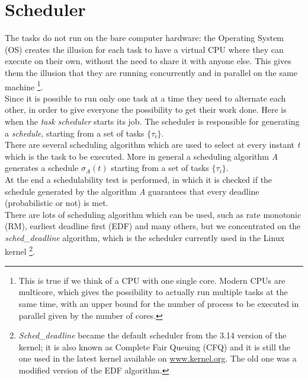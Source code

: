 \section{Scheduler}
The tasks do not run on the bare computer hardware: the Operating System (OS) creates the illusion for each task to have a virtual CPU where they can execute on their own, without the need to share it with anyone else. This gives them the illusion that they are running concurrently and in parallel on the same machine \footnote{This is true if we think of a CPU with one single core. Modern CPUs are multicore, which gives the possibility to actually run multiple tasks at the same time, with an upper bound for the number of process to be executed in parallel given by the number of cores.}.\\
Since it is possible to run only one task at a time they need to alternate each other, in order to give everyone the possibility to get their work done. Here is when the \emph{task scheduler} starts its job. The scheduler is responsible for generating a \emph{schedule}, starting from a set of tasks \( \{\tau_{i}\} \).\\
There are several scheduling algorithm which are used to select at every instant \emph{t} which is the task to be executed. More in general a scheduling algorithm \emph{A} generates a schedule \( \sigma_{A}\left(t\right) \) starting from a set of tasks \( \{\tau_{i}\} \).\\
At the end a schedulability test is performed, in which it is checked if the schedule generated by the algorithm \emph{A} guarantees that every deadline (probabilistic or not) is met.\\
There are lots of scheduling algorithm which can be used, such as rate monotonic (RM), earliest deadline first (EDF) and many others, but we concentrated on the \emph{sched\_deadline} algorithm, which is the scheduler currently used in the Linux kernel \footnote{\emph{Sched\_deadline} became the default scheduler from the 3.14 version of the kernel; it is also known as Complete Fair Queuing (CFQ) and it is still the one used in the latest kernel available on \url{www.kernel.org}. The old one was a modified version of the EDF algorithm.}.

